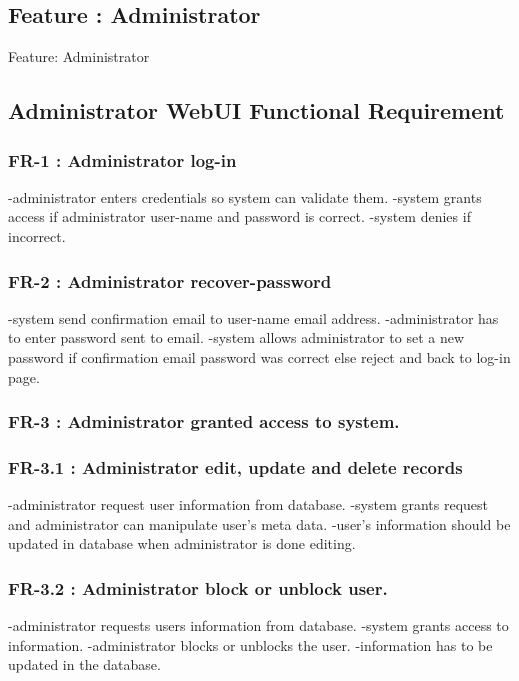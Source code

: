 \begin{Requirements}
\section{Feature : Administrator}
Feature:  Administrator 
\subsection{Administrator WebUI Functional Requirement}

\subsubsection{FR-1  : Administrator log-in}
	  	-administrator enters credentials so system can validate them.
	 	-system grants access if administrator user-name and password is correct.
	 	-system denies if incorrect.
	  
\subsubsection{FR-2   : Administrator recover-password}
		-system send confirmation email to user-name email address.
		-administrator has to enter password sent to email.
	  	-system allows administrator to set a new password if confirmation email password 		 was correct else reject and back to log-in page.
\subsubsection{FR-3   :	Administrator granted access to system.}
  	
\subsubsection{FR-3.1 :	Administrator edit, update and delete records}
		-administrator request user information from database.
		-system grants request and administrator can manipulate user's meta data.
		-user's information should be updated in database when administrator is done 	 	 		 editing.
		
\subsubsection{FR-3.2 :	Administrator block or unblock user.}
		-administrator requests users information from database.
		-system grants access to information.
		-administrator blocks or unblocks the user.
		-information has to be updated in the database.
		

\end{Requirements}
